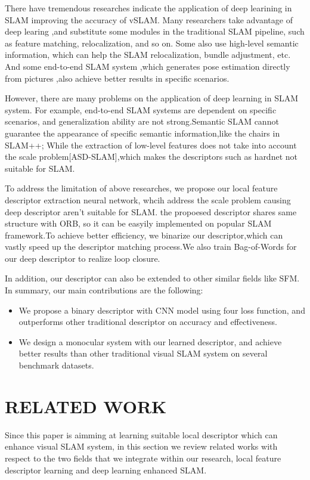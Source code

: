 \documentclass[letterpaper, 10 pt, conference]{ieeeconf}  %
\begin{document}
There have tremendous researches indicate the application of deep learining in SLAM improving the accuracy of vSLAM. Many researchers take advantage of deep learing ,and substitute some modules in the traditional SLAM pipeline, such as feature matching, relocalization, and so on. Some also use high-level semantic information, which can help the SLAM relocalization, bundle adjustment, etc. And some end-to-end SLAM system  ,which generates pose estimation directly from pictures ,also achieve better results in specific scenarios.

However, there are many problems on the application of deep learning in SLAM system. For example, end-to-end SLAM systems are dependent on specific scenarios, and generalization ability are not strong.Semantic SLAM cannot guarantee the  appearance of specific semantic information,like the chairs in SLAM++; While the extraction of low-level features does not take into account the scale problem[ASD-SLAM],which makes the descriptors such as hardnet not suitable for SLAM.

To address the limitation of above researches, we propose our local feature descriptor extraction neural network, whcih address the scale problem causing deep descriptor aren't suitable for SLAM. the propoesed descriptor shares same structure with ORB, so it can be  easyily implemented on popular SLAM framework.To achieve better efficiency, we binarize our descriptor,which can vastly speed up the descriptor matching process.We also train Bag-of-Words for our deep descriptor to realize loop closure. 

In addition, our descriptor can also be extended to other similar fields like SFM. In summary, our main contributions are the following:
\begin{itemize}
\item We propose a binary descriptor with CNN model using four loss function, and outperforms other traditional descriptor on accuracy and effectiveness. 
\item We design a monocular system with our learned descriptor, and achieve better results than other traditional visual SLAM system on several benchmark datasets.
\end{itemize}

\section{RELATED WORK}
Since this paper is aimming at learning suitable local descriptor which can enhance visual SLAM system, in this section we review related works with respect to the two fields that we integrate within our research, local feature descriptor learning and deep learning enhanced SLAM.
\end{document}
